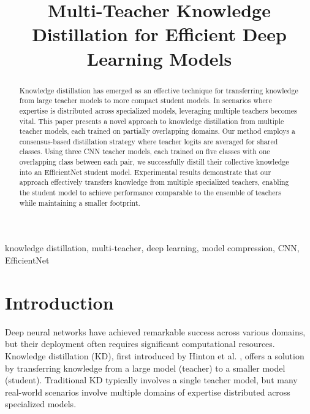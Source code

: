 \documentclass[conference]{IEEEtran}
\begin{document}
\title{Multi-Teacher Knowledge Distillation for Efficient Deep Learning Models}

\author{
}

\maketitle

\begin{abstract}
Knowledge distillation has emerged as an effective technique for transferring knowledge from large teacher models to more compact student models. In scenarios where expertise is distributed across specialized models, leveraging multiple teachers becomes vital. This paper presents a novel approach to knowledge distillation from multiple teacher models, each trained on partially overlapping domains. Our method employs a consensus-based distillation strategy where teacher logits are averaged for shared classes. Using three CNN teacher models, each trained on five classes with one overlapping class between each pair, we successfully distill their collective knowledge into an EfficientNet student model. Experimental results demonstrate that our approach effectively transfers knowledge from multiple specialized teachers, enabling the student model to achieve performance comparable to the ensemble of teachers while maintaining a smaller footprint.
\end{abstract}

\begin{IEEEkeywords}
knowledge distillation, multi-teacher, deep learning, model compression, CNN, EfficientNet
\end{IEEEkeywords}

\section{Introduction}
Deep neural networks have achieved remarkable success across various domains, but their deployment often requires significant computational resources. Knowledge distillation (KD), first introduced by Hinton et al. \cite{hinton2015distilling}, offers a solution by transferring knowledge from a large model (teacher) to a smaller model (student). Traditional KD typically involves a single teacher model, but many real-world scenarios involve multiple domains of expertise distributed across specialized models.
\end{document}
